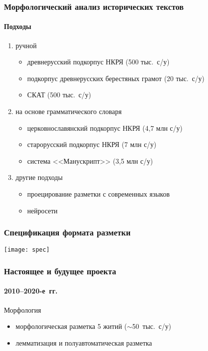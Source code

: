 \begin{frame}
  \frametitle{Морфологический анализ исторических текстов}
  \framesubtitle{Подходы}

  \begin{block}{}
    \begin{enumerate}
      \item<1-> ручной \begin{itemize}
        \item древнерусский подкорпус НКРЯ (500 тыс.\ с/у)
        \item подкорпус древнерусских берестяных грамот (20 тыс.\ с/у)
        \item СКАТ (500 тыс.\ с/у)
      \end{itemize}
      \item<2-> на основе грамматического словаря \begin{itemize}
        \item церковнославянский подкорпус НКРЯ (4,7 млн с/у)
        \item старорусский подкорпус НКРЯ (7 млн с/у)
        \item система <<Манускрипт>> (3,5 млн с/у)
      \end{itemize}
      \item<3-> другие подходы \begin{itemize}
        \item проецирование разметки с современных языков
        \item нейросети
      \end{itemize}
    \end{enumerate}
  \end{block}
\end{frame}

\begin{frame}
  \frametitle{Спецификация формата разметки}

  \begin{center}
    \texttt{[image: spec]}
  \end{center}
\end{frame}

\begin{frame}
  \frametitle{Настоящее и будущее проекта}
  \framesubtitle{2010--2020-е~гг.}

  \begin{block}{Морфология}
    \begin{itemize}
      \item морфологическая разметка 5 житий ($\sim$50~тыс.\ с/у)
      \item лемматизация и полуавтоматическая разметка\autocite{sipunin:2020}
    \end{itemize}
  \end{block}
\end{frame}

